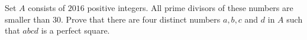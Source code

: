 Set $A$ consists of $2016$ positive integers. All prime divisors of these numbers are smaller than $30.$ Prove that there are four distinct numbers $a, b, c$ and $d$ in $A$ such that $abcd$ is a perfect square.